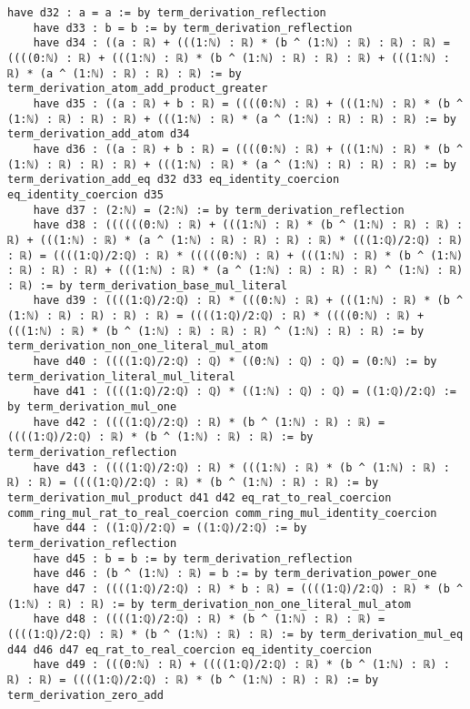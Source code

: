 \documentclass{article}
\begin{document}
\begin{tcolorbox}[colback=white!10, width=\linewidth]
\begin{lstlisting}[language=Lean4]
    have d32 : a = a := by term_derivation_reflection
    have d33 : b = b := by term_derivation_reflection
    have d34 : ((a : ℝ) + (((1:ℕ) : ℝ) * (b ^ (1:ℕ) : ℝ) : ℝ) : ℝ) = ((((0:ℕ) : ℝ) + (((1:ℕ) : ℝ) * (b ^ (1:ℕ) : ℝ) : ℝ) : ℝ) + (((1:ℕ) : ℝ) * (a ^ (1:ℕ) : ℝ) : ℝ) : ℝ) := by term_derivation_atom_add_product_greater
    have d35 : ((a : ℝ) + b : ℝ) = ((((0:ℕ) : ℝ) + (((1:ℕ) : ℝ) * (b ^ (1:ℕ) : ℝ) : ℝ) : ℝ) + (((1:ℕ) : ℝ) * (a ^ (1:ℕ) : ℝ) : ℝ) : ℝ) := by term_derivation_add_atom d34
    have d36 : ((a : ℝ) + b : ℝ) = ((((0:ℕ) : ℝ) + (((1:ℕ) : ℝ) * (b ^ (1:ℕ) : ℝ) : ℝ) : ℝ) + (((1:ℕ) : ℝ) * (a ^ (1:ℕ) : ℝ) : ℝ) : ℝ) := by term_derivation_add_eq d32 d33 eq_identity_coercion eq_identity_coercion d35
    have d37 : (2:ℕ) = (2:ℕ) := by term_derivation_reflection
    have d38 : ((((((0:ℕ) : ℝ) + (((1:ℕ) : ℝ) * (b ^ (1:ℕ) : ℝ) : ℝ) : ℝ) + (((1:ℕ) : ℝ) * (a ^ (1:ℕ) : ℝ) : ℝ) : ℝ) : ℝ) * (((1:ℚ)/2:ℚ) : ℝ) : ℝ) = ((((1:ℚ)/2:ℚ) : ℝ) * (((((0:ℕ) : ℝ) + (((1:ℕ) : ℝ) * (b ^ (1:ℕ) : ℝ) : ℝ) : ℝ) + (((1:ℕ) : ℝ) * (a ^ (1:ℕ) : ℝ) : ℝ) : ℝ) ^ (1:ℕ) : ℝ) : ℝ) := by term_derivation_base_mul_literal
    have d39 : ((((1:ℚ)/2:ℚ) : ℝ) * (((0:ℕ) : ℝ) + (((1:ℕ) : ℝ) * (b ^ (1:ℕ) : ℝ) : ℝ) : ℝ) : ℝ) = ((((1:ℚ)/2:ℚ) : ℝ) * ((((0:ℕ) : ℝ) + (((1:ℕ) : ℝ) * (b ^ (1:ℕ) : ℝ) : ℝ) : ℝ) ^ (1:ℕ) : ℝ) : ℝ) := by term_derivation_non_one_literal_mul_atom
    have d40 : ((((1:ℚ)/2:ℚ) : ℚ) * ((0:ℕ) : ℚ) : ℚ) = (0:ℕ) := by term_derivation_literal_mul_literal
    have d41 : ((((1:ℚ)/2:ℚ) : ℚ) * ((1:ℕ) : ℚ) : ℚ) = ((1:ℚ)/2:ℚ) := by term_derivation_mul_one
    have d42 : ((((1:ℚ)/2:ℚ) : ℝ) * (b ^ (1:ℕ) : ℝ) : ℝ) = ((((1:ℚ)/2:ℚ) : ℝ) * (b ^ (1:ℕ) : ℝ) : ℝ) := by term_derivation_reflection
    have d43 : ((((1:ℚ)/2:ℚ) : ℝ) * (((1:ℕ) : ℝ) * (b ^ (1:ℕ) : ℝ) : ℝ) : ℝ) = ((((1:ℚ)/2:ℚ) : ℝ) * (b ^ (1:ℕ) : ℝ) : ℝ) := by term_derivation_mul_product d41 d42 eq_rat_to_real_coercion comm_ring_mul_rat_to_real_coercion comm_ring_mul_identity_coercion
    have d44 : ((1:ℚ)/2:ℚ) = ((1:ℚ)/2:ℚ) := by term_derivation_reflection
    have d45 : b = b := by term_derivation_reflection
    have d46 : (b ^ (1:ℕ) : ℝ) = b := by term_derivation_power_one
    have d47 : ((((1:ℚ)/2:ℚ) : ℝ) * b : ℝ) = ((((1:ℚ)/2:ℚ) : ℝ) * (b ^ (1:ℕ) : ℝ) : ℝ) := by term_derivation_non_one_literal_mul_atom
    have d48 : ((((1:ℚ)/2:ℚ) : ℝ) * (b ^ (1:ℕ) : ℝ) : ℝ) = ((((1:ℚ)/2:ℚ) : ℝ) * (b ^ (1:ℕ) : ℝ) : ℝ) := by term_derivation_mul_eq d44 d46 d47 eq_rat_to_real_coercion eq_identity_coercion
    have d49 : (((0:ℕ) : ℝ) + ((((1:ℚ)/2:ℚ) : ℝ) * (b ^ (1:ℕ) : ℝ) : ℝ) : ℝ) = ((((1:ℚ)/2:ℚ) : ℝ) * (b ^ (1:ℕ) : ℝ) : ℝ) := by term_derivation_zero_add

\end{lstlisting}
\end{tcolorbox}
\end{document}
